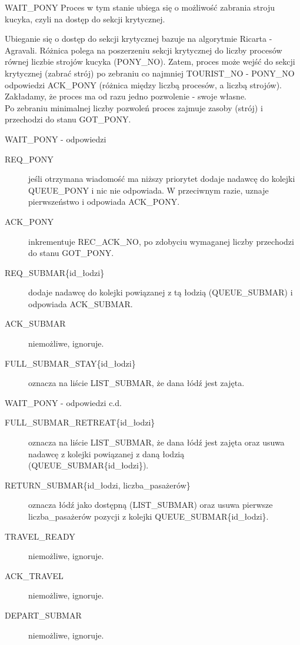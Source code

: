 \documentclass{beamer}
\begin{document}
\begin{frame}{WAIT\_PONY}
    \internallinenumbers
    \resetlinenumber[1]
    Proces w tym stanie ubiega się o  możliwość zabrania stroju kucyka, czyli na dostęp do sekcji krytycznej.

    \vspace{0.4cm}
    Ubieganie się o dostęp do sekcji krytycznej bazuje na algorytmie Ricarta - Agravali. Różnica polega na poszerzeniu sekcji krytycznej do liczby procesów równej liczbie strojów kucyka (PONY\_NO). Zatem, proces może wejść do sekcji krytycznej (zabrać strój) po zebraniu co najmniej TOURIST\_NO - PONY\_NO odpowiedzi ACK\_PONY (różnica między liczbą procesów, a liczbą strojów). Zakładamy, że proces ma od razu jedno pozwolenie - swoje własne. \\
    Po zebraniu minimalnej liczby pozwoleń proces zajmuje zasoby (strój) i przechodzi do stanu GOT\_PONY.
\end{frame}

\begin{frame}{WAIT\_PONY - odpowiedzi}
    \internallinenumbers
    \resetlinenumber[1]
    \begin{description}
        \item [REQ\_PONY] jeśli otrzymana wiadomość ma niższy priorytet dodaje nadawcę do kolejki QUEUE\_PONY i nic nie odpowiada. W przeciwnym razie, uznaje pierwszeństwo i odpowiada ACK\_PONY.
        \item [ACK\_PONY] inkrementuje REC\_ACK\_NO, po zdobyciu wymaganej liczby przechodzi do stanu GOT\_PONY.
        \item [REQ\_SUBMAR\{id\_łodzi\}] dodaje nadawcę do kolejki powiązanej z tą łodzią (QUEUE\_SUBMAR) i odpowiada ACK\_SUBMAR.
        \item [ACK\_SUBMAR] niemożliwe, ignoruje.
        \item [FULL\_SUBMAR\_STAY\{id\_łodzi\}] oznacza na liście LIST\_SUBMAR, że dana łódź jest zajęta.

    \end{description}
\end{frame}

\begin{frame}{WAIT\_PONY - odpowiedzi c.d.}
    \internallinenumbers
    \resetlinenumber[1]
    \begin{description}
        \item [FULL\_SUBMAR\_RETREAT\{id\_łodzi\}] oznacza na liście LIST\_SUBMAR, że dana łódź jest zajęta oraz usuwa nadawcę z kolejki powiązanej z daną łodzią (QUEUE\_SUBMAR\{id\_łodzi\}).
        \item [RETURN\_SUBMAR\{id\_łodzi, liczba\_pasażerów\}] oznacza łódź jako dostępną (LIST\_SUBMAR) oraz usuwa pierwsze liczba\_pasażerów pozycji z kolejki QUEUE\_SUBMAR\{id\_łodzi\}.
        \item [TRAVEL\_READY] niemożliwe, ignoruje.
        \item [ACK\_TRAVEL] niemożliwe, ignoruje.
        \item [DEPART\_SUBMAR] niemożliwe, ignoruje.
    \end{description}
\end{frame}
\end{document}
